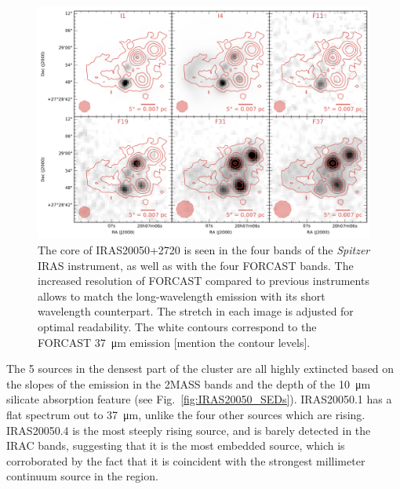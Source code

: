 \begin{landscape}
\begin{figure}
\begin{center}
\includegraphics[width=1.3\textwidth]{Figures/IRAS20050.png}
\caption{The core of IRAS20050+2720 is seen in the four bands of the \textit{Spitzer} IRAS instrument, as well as with the four FORCAST bands. The increased resolution of FORCAST compared to previous instruments allows to match the long-wavelength emission with its short wavelength counterpart. The stretch in each image is adjusted for optimal readability. The white contours correspond to the FORCAST \SI{37}{\micro\meter} emission [mention the contour levels]. }
\label{fig:IRAS20050_mosaic}
\end{center}
\end{figure}
\end{landscape}

The 5 sources in the densest part of the cluster are all highly extincted based on the slopes of the emission in the 2MASS bands and the depth of the \SI{10}{\um} silicate absorption feature (see Fig.~\ref{fig:IRAS20050_SEDs}). IRAS20050.1 has a flat spectrum out to \SI{37}{\um}, unlike the four other sources which are rising. IRAS20050.4 is the most steeply rising source, and is barely detected in the IRAC bands, suggesting that it is the most embedded source, which is corroborated by the fact that it is coincident with the strongest millimeter continuum source in the region. 


